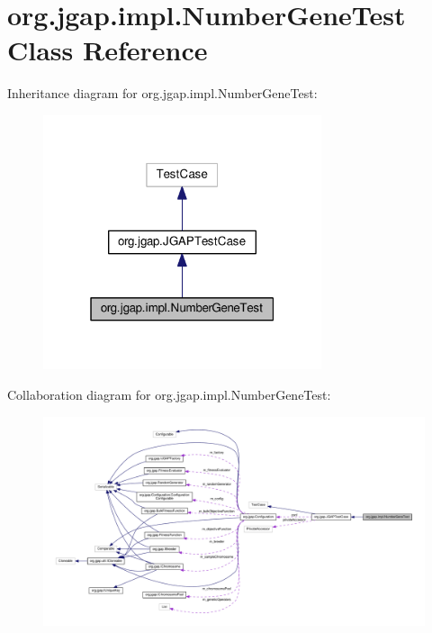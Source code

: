 \hypertarget{classorg_1_1jgap_1_1impl_1_1_number_gene_test}{\section{org.\-jgap.\-impl.\-Number\-Gene\-Test Class Reference}
\label{classorg_1_1jgap_1_1impl_1_1_number_gene_test}
}


Inheritance diagram for org.\-jgap.\-impl.\-Number\-Gene\-Test\-:
\nopagebreak
\begin{figure}[H]
\begin{center}
\leavevmode
\includegraphics[width=232pt]{classorg_1_1jgap_1_1impl_1_1_number_gene_test__inherit__graph}
\end{center}
\end{figure}


Collaboration diagram for org.\-jgap.\-impl.\-Number\-Gene\-Test\-:
\nopagebreak
\begin{figure}[H]
\begin{center}
\leavevmode
\includegraphics[width=350pt]{classorg_1_1jgap_1_1impl_1_1_number_gene_test__coll__graph}
\end{center}
\end{figure}
